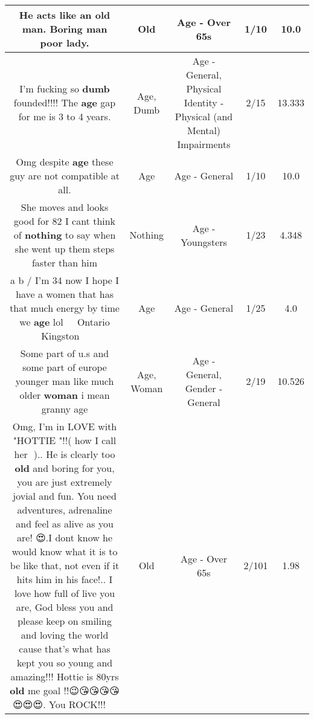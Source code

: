 \documentclass[11pt]{article}
\newlength\mylength
\begin{document}
\begin{center}
\begin{longtable}{|C{.65\mylength}|C{.30\mylength}|C{.12\mylength}|C{.12\mylength}|C{.12\mylength}|}
  \small He acts like an \textbf{old} man. Boring man poor lady.\normalsize   & Old & Age - Over 65s & 1/10 & 10.0 \\  \hline
  \small I'm fucking so \textbf{dumb} founded!!!! The \textbf{age} gap for me is 3 to 4 years.\normalsize   & Age, Dumb & Age - General, Physical Identity - Physical (and Mental) Impairments & 2/15 & 13.333 \\  \hline
  \small Omg despite \textbf{age} these guy are not compatible at all.\normalsize   & Age & Age - General & 1/10 & 10.0 \\  \hline
  \small She moves and looks good for 82 I cant think of \textbf{nothing} to say when she went up them steps faster than him\normalsize   & Nothing & Age - Youngsters & 1/23 & 4.348 \\  \hline
  \small a b / I'm 34 now I hope I have a women that has that much energy by time we \textbf{age} lol 🍻🍻🇨🇦Ontario Kingston 🤘🤘\normalsize   & Age & Age - General & 1/25 & 4.0 \\  \hline
  \small Some part of u.s and some part of europe younger man like much older \textbf{woman} i mean granny age\normalsize   & Age, Woman & Age - General, Gender - General & 2/19 & 10.526 \\  \hline
  \small Omg, I'm in LOVE with "HOTTIE "!!( how I call her 🤗).. He is clearly too \textbf{old} and boring for you, you are just extremely  jovial and fun. You need adventures, adrenaline and feel as alive as you are! 😍.I dont know he would know what it is to be like that, not even if it hits him in his face!.. I love how full of live you are, God bless you and please  keep on smiling and  loving the world cause that's what has kept you so young and amazing!!!  Hottie is 80yrs \textbf{old}  me goal !!😉😘😘😘😘😍😍😍. You ROCK!!!🤩🤩🤩🤩\normalsize   & Old & Age - Over 65s & 2/101 & 1.98 \\  \hline

\end{longtable}
\end{center}
\end{document}

